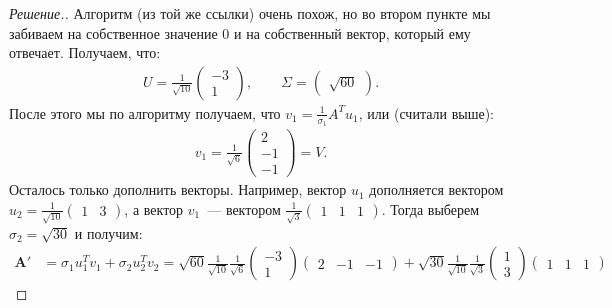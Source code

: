 \documentclass[a4paper]{article}
\theoremstyle{remark}
\begin{document}
\begin{proof}[Решение.]
          Алгоритм (из той же ссылки) очень похож, но во втором пункте мы забиваем на собственное значение $0$ и на собственный вектор, который ему отвечает. Получаем, что:
          \begin{align*}
            U = \frac{1}{\sqrt{10}}\begin{pmatrix}
              -3 \\
              1 
            \end{pmatrix}, \quad\quad 
            \Sigma = \begin{pmatrix}
              \sqrt{60}
            \end{pmatrix}.
          \end{align*}
          После этого мы по алгоритму получаем, что $v_1 = \frac{1}{\sigma_1} A^T u_1$, или (считали выше):
          \begin{align*}
            v_1 = \frac{1}{\sqrt{6}} \begin{pmatrix}
              2 \\
              -1 \\
              -1
            \end{pmatrix} = V.
          \end{align*}
          Осталось только дополнить векторы. Например, вектор $u_1$ дополняется вектором $u_2 = \frac{1}{\sqrt{10}} \begin{pmatrix}
            1 & 3
          \end{pmatrix}$, а вектор $v_1$~--- вектором $\frac{1}{\sqrt{3}} \begin{pmatrix}
            1 & 1 & 1
          \end{pmatrix}$. Тогда выберем $\sigma_2 = \sqrt{30}$ и получим:
          \begin{align*}
            \bm{A'} &\bm{=} \sigma_1u_1^Tv_1 + \sigma_2 u_2^T v_2 = \sqrt{60} \frac{1}{\sqrt{10}} \frac{1}{\sqrt{6}} \begin{pmatrix}
              -3 \\
              1
            \end{pmatrix} \begin{pmatrix}
              2 & -1 & -1
            \end{pmatrix} + \sqrt{30} \frac{1}{\sqrt{10}} \frac{1}{\sqrt{3}} \begin{pmatrix}
              1 \\
              3
            \end{pmatrix} \begin{pmatrix}
              1 & 1 & 1

\end{pmatrix}
\end{align*}
\end{proof}
\end{document}
